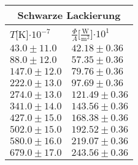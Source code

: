 \documentclass{article}
\begin{document}
\begin{tabular}{|p{3cm}|p{3cm}|}
\hline
\multicolumn{2}{|c|}{Schwarze Lackierung}\\
\hline
$T$[K]$\cdot 10^{-7}$&$\frac{\Phi}{A}$[$\frac{\textrm{W}}{\textrm{m}^2}$]$\cdot 10^{1}$\\
\hline
$43.0\pm11.0$&$42.18\pm 0.36$\\
$88.0\pm12.0$&$57.35\pm 0.36$\\
$147.0\pm12.0$&$79.76\pm 0.36$\\
$222.0\pm13.0$&$97.69\pm 0.36$\\
$274.0\pm13.0$&$121.49\pm 0.36$\\
$341.0\pm14.0$&$143.56\pm 0.36$\\
$427.0\pm15.0$&$168.38\pm 0.36$\\
$502.0\pm15.0$&$192.52\pm 0.36$\\
$580.0\pm16.0$&$219.07\pm 0.36$\\
$679.0\pm17.0$&$243.56\pm 0.36$\\
\hline
\end{tabular}
\end{document}
